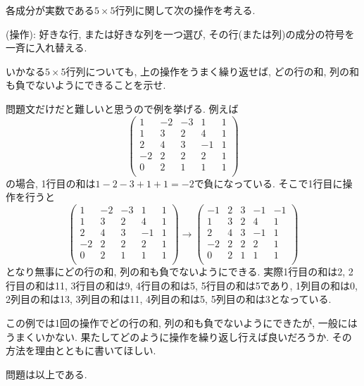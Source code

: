 \documentclass[dvipdfmx,a4paper,11pt]{article}
\theoremstyle{definition}
\begin{document}
各成分が実数である$5\times 5$行列に関して次の操作を考える. 
\begin{tcolorbox}[
    colback = white,
    colframe = black,
    fonttitle = \bfseries,
    breakable = true]
(操作): 好きな行, または好きな列を一つ選び, その行(または列)の成分の符号を一斉に入れ替える.
 \end{tcolorbox}
いかなる$5\times 5$行列についても, 上の操作をうまく繰り返せば, どの行の和, 列の和も負でないようにできることを示せ.

\medskip
[補足] 問題文だけだと難しいと思うので例を挙げる. 
例えば
$$
 \begin{pmatrix}
1 & -2 & -3& 1 & 1\\
1 & 3 & 2& 4 & 1\\
2 & 4 & 3 & -1& 1\\
-2 & 2 & 2& 2 & 1\\
0& 2 & 1 & 1 & 1\\
 \end{pmatrix}
 $$
 の場合, 1行目の和は$1-2-3+1+1=-2$で負になっている.
 そこで1行目に操作を行うと
 $$
  \begin{pmatrix}
1 & -2 & -3& 1 & 1\\
1 & 3 & 2& 4 & 1\\
2 & 4 & 3 & -1& 1\\
-2 & 2 & 2& 2 & 1\\
0& 2 & 1 & 1 & 1\\
 \end{pmatrix}
 \rightarrow 
  \begin{pmatrix}
-1 & 2 & 3& -1 & -1\\
1 & 3 & 2& 4 & 1\\
2 & 4 & 3 & -1& 1\\
-2 & 2 & 2& 2 & 1\\
0& 2 & 1 & 1 & 1\\
 \end{pmatrix}
 $$
となり無事にどの行の和, 列の和も負でないようにできる. 
実際1行目の和は2, 2行目の和は11, 3行目の和は9, 4行目の和は5, 5行目の和は5であり,   
1列目の和は0, 2列目の和は13, 3列目の和は11, 4列目の和は5, 5列目の和は3となっている. 

この例では1回の操作でどの行の和, 列の和も負でないようにできたが, 一般にはうまくいかない.
果たしてどのように操作を繰り返し行えば良いだろうか. その方法を理由とともに書いてほしい. 

\begin{flushright}
\LARGE{問題は以上である. }
\end{flushright}
 
\end{document}
